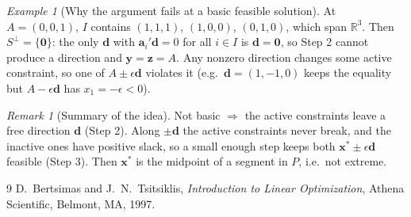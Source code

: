 \documentclass[11pt]{article}
\theoremstyle{remark}
\newtheorem*{example}{Example}
\newtheorem*{remark}{Remark}
\begin{document}
\begin{example}[Why the argument fails at a basic feasible solution]
At $A=(0,0,1)$, $I$ contains $(1,1,1)$, $(1,0,0)$, $(0,1,0)$, which span $\mathbb{R}^3$. Then $S^\perp=\{\mathbf 0\}$: the only $\mathbf d$ with $\mathbf a_i'\mathbf d=0$ for all $i\in I$ is $\mathbf d=\mathbf 0$, so Step 2 cannot produce a direction and $\mathbf y=\mathbf z=A$. Any nonzero direction changes some active constraint, so one of $A\pm\epsilon\mathbf d$ violates it (e.g.\ $\mathbf d=(1,-1,0)$ keeps the equality but $A-\epsilon\mathbf d$ has $x_1=-\epsilon<0$).
\end{example}

\begin{remark}[Summary of the idea]
Not basic $\Rightarrow$ the active constraints leave a free direction $\mathbf d$ (Step 2). Along $\pm\mathbf d$ the active constraints never break, and the inactive ones have positive slack, so a small enough step keeps both $\mathbf x^*\pm\epsilon\mathbf d$ feasible (Step 3). Then $\mathbf x^*$ is the midpoint of a segment in $P$, i.e.\ not extreme.
\end{remark}

\begin{thebibliography}{9}
D.~Bertsimas and J.~N.~Tsitsiklis,
\emph{Introduction to Linear Optimization},
Athena Scientific, Belmont, MA, 1997.
\end{thebibliography}
\end{document}
